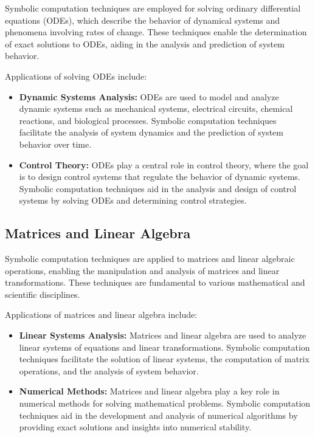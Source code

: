 Symbolic computation techniques are employed for solving ordinary differential equations (ODEs), which describe the behavior of dynamical systems and phenomena involving rates of change. These techniques enable the determination of exact solutions to ODEs, aiding in the analysis and prediction of system behavior.

Applications of solving ODEs include:
%
\begin{itemize}
  \setlength{\itemsep}{0.0em}
  \item \textbf{Dynamic Systems Analysis:} ODEs are used to model and analyze dynamic systems such as mechanical systems, electrical circuits, chemical reactions, and biological processes. Symbolic computation techniques facilitate the analysis of system dynamics and the prediction of system behavior over time.
  \item \textbf{Control Theory:} ODEs play a central role in control theory, where the goal is to design control systems that regulate the behavior of dynamic systems. Symbolic computation techniques aid in the analysis and design of control systems by solving ODEs and determining control strategies.
\end{itemize}

\subsection{Matrices and Linear Algebra}

Symbolic computation techniques are applied to matrices and linear algebraic operations, enabling the manipulation and analysis of matrices and linear transformations. These techniques are fundamental to various mathematical and scientific disciplines.

Applications of matrices and linear algebra include:
%
\begin{itemize}
  \setlength{\itemsep}{0.0em}
  \item \textbf{Linear Systems Analysis:} Matrices and linear algebra are used to analyze linear systems of equations and linear transformations. Symbolic computation techniques facilitate the solution of linear systems, the computation of matrix operations, and the analysis of system behavior.
  \item \textbf{Numerical Methods:} Matrices and linear algebra play a key role in numerical methods for solving mathematical problems. Symbolic computation techniques aid in the development and analysis of numerical algorithms by providing exact solutions and insights into numerical stability.
\end{itemize}

